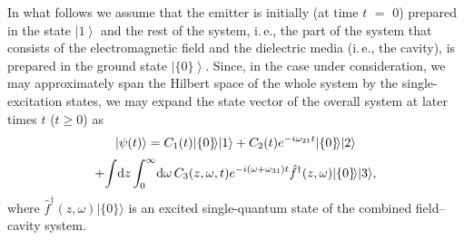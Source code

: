 \documentclass[pra, twocolumn]{revtex4}
\newcommand{\D}{\mbox{\rm d}}
\newcommand{\ket}[1]{$\left|#1\right\rangle$}
\begin{document}
In what follows we assume that
the emitter is initially (at time $t$ $\!=$ $\!0$)
prepared in the state \ket{1} and the rest of
the system, i.\,e., the part of the
system that consists of the
electromagnetic field and the dielectric media
(i.\,e., the cavity),
is prepared in the ground
state \ket{\{0\}}.
Since, in the case under consideration,
we may approximately span the Hilbert space of the whole system by the
single-excitation states,
we may expand the state
vector of the overall system at later times $t$ ($t\ge 0$) as
\begin{multline}
\label{1.17}
	|\psi(t)\rangle =
   C_1(t)
  |\!\left\lbrace0\right\rbrace\!\rangle|1\rangle +
  C_2(t)
e^{-i\omega_{21} t}
  |\!\left\lbrace0\right\rbrace\!\rangle |2\rangle
\\[.5ex]
+\!\int\! \D z \int_0^\infty \!\D \omega\,
   C_3(z, \omega, t)
   e^{-i(\omega +\omega _{31})t}
   \hat{f}^{\dagger}(z, \omega)
   |\!\left\lbrace0\right\rbrace\!\rangle |3\rangle ,
\end{multline}
where $\hat{f}^{\dagger}(z, \omega)|\{0\}\rangle$ is
an excited single-quantum state of the combined
field--cavity system.
\end{document}
